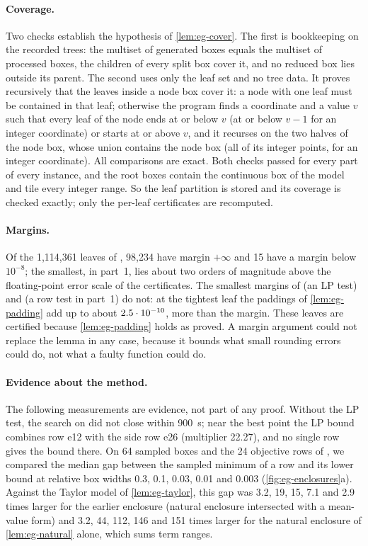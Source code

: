 \paragraph{Coverage.}
Two checks establish the hypothesis of \cref{lem:eg-cover}.
The first is bookkeeping on the recorded trees: the multiset of generated boxes equals the multiset of processed boxes, the children of every split box cover it, and no reduced box lies outside its parent.
The second uses only the leaf set and no tree data.
It proves recursively that the leaves inside a node box cover it: a node with one leaf must be contained in that leaf; otherwise the program finds a coordinate and a value $v$ such that every leaf of the node ends at or below $v$ (at or below $v-1$ for an integer coordinate) or starts at or above $v$, and it recurses on the two halves of the node box, whose union contains the node box (all of its integer points, for an integer coordinate).
All comparisons are exact.
Both checks passed for every part of every instance, and the root boxes contain the continuous box of the model and tile every integer range.
So the leaf partition is stored and its coverage is checked exactly; only the per-leaf certificates are recomputed.

\paragraph{Margins.}
Of the 1{,}114{,}361 leaves of , 98{,}234 have margin $+\infty$ and 15 have a margin below $10^{-8}$; the smallest, in part~1, lies about two orders of magnitude above the floating-point error scale of the certificates.
The smallest margins of  (an LP test) and  (a row test in part~1) do not: at the tightest  leaf the paddings of \cref{lem:eg-padding} add up to about $2.5\cdot 10^{-10}$, more than the margin.
These leaves are certified because \cref{lem:eg-padding} holds as proved.
A margin argument could not replace the lemma in any case, because it bounds what small rounding errors could do, not what a faulty function could do.

\paragraph{Evidence about the method.}
The following measurements are evidence, not part of any proof.
Without the LP test, the search on  did not close within 900~s; near the best point the LP bound combines row e12 with the side row e26 (multiplier 22.27), and no single row gives the bound there.
On 64 sampled boxes and the 24 objective rows of , we compared the median gap between the sampled minimum of a row and its lower bound at relative box widths 0.3, 0.1, 0.03, 0.01 and 0.003 (\cref{fig:eg-enclosures}a).
Against the Taylor model of \cref{lem:eg-taylor}, this gap was 3.2, 19, 15, 7.1 and 2.9 times larger for the earlier enclosure (natural enclosure intersected with a mean-value form) and 3.2, 44, 112, 146 and 151 times larger for the natural enclosure of \cref{lem:eg-natural} alone, which sums term ranges.

